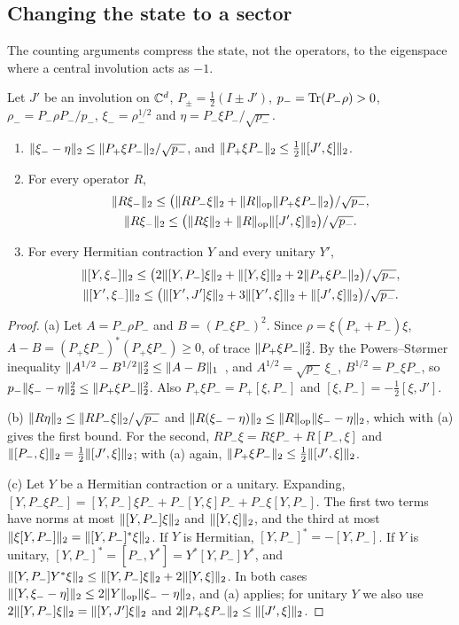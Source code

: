 \subsection{Changing the state to a sector}\label{state:sector}

The counting arguments compress the state, not the operators, to the eigenspace where a central involution acts as $-1$.

\begin{lemma}\label{lem:sector-state}
Let $J'$ be an involution on $\mathbb C^d$, $P_\pm=\frac12(I\pm J')$, $p_-=\operatorname{Tr}(P_-\rho)>0$, $\rho_-=P_-\rho P_-/p_-$, $\xi_-=\rho_-^{1/2}$ and
$\eta=P_-\xi P_-/\sqrt{p_-}$.
\begin{enumerate}[label=(\alph*),itemsep=1pt]
\item $\lVert \xi_--\eta\rVert_2\le\lVert P_+\xi P_-\rVert_2/\sqrt{p_-}$, and $\lVert P_+\xi P_-\rVert_2\le\frac12\lVert [J',\xi]\rVert_2$.
\item For every operator $R$,
\begin{gather*}
\lVert R\xi_-\rVert_2\le\bigl(\lVert RP_-\xi\rVert_2+\lVert R\rVert_{\mathrm{op}}\lVert P_+\xi P_-\rVert_2\bigr)/\sqrt{p_-},\\
\lVert R\xi_-\rVert_2\le\bigl(\lVert R\xi\rVert_2+\lVert R\rVert_{\mathrm{op}}\lVert [J',\xi]\rVert_2\bigr)/\sqrt{p_-}.
\end{gather*}
\item For every Hermitian contraction $Y$ and every unitary $Y'$,
\begin{gather*}
\lVert [Y,\xi_-]\rVert_2\le\bigl(2\lVert [Y,P_-]\xi\rVert_2+\lVert [Y,\xi]\rVert_2+2\lVert P_+\xi P_-\rVert_2\bigr)/\sqrt{p_-},\\
\lVert [Y',\xi_-]\rVert_2\le\bigl(\lVert [Y',J']\xi\rVert_2+3\lVert [Y',\xi]\rVert_2+\lVert [J',\xi]\rVert_2\bigr)/\sqrt{p_-}.
\end{gather*}
\end{enumerate}
\end{lemma}

\begin{proof}
(a) Let $A=P_-\rho P_-$ and $B=(P_-\xi P_-)^2$. Since $\rho=\xi(P_++P_-)\xi$, $A-B=(P_+\xi P_-)^*(P_+\xi P_-)\ge0$, of trace
$\lVert P_+\xi P_-\rVert_2^2$. By the Powers--St{\o}rmer inequality $\lVert A^{1/2}-B^{1/2}\rVert_2^2\le\lVert A-B\rVert_1$~\cite[Lemma~4.1]{PS70}, and
$A^{1/2}=\sqrt{p_-}\,\xi_-$, $B^{1/2}=P_-\xi P_-$, so $p_-\lVert \xi_--\eta\rVert_2^2\le\lVert P_+\xi P_-\rVert_2^2$. Also $P_+\xi P_-=P_+[\xi,P_-]$ and
$[\xi,P_-]=-\frac12[\xi,J']$.

(b) $\lVert R\eta\rVert_2\le\lVert RP_-\xi\rVert_2/\sqrt{p_-}$ and $\lVert R(\xi_--\eta)\rVert_2\le\lVert R\rVert_{\mathrm{op}}\lVert \xi_--\eta\rVert_2$, which with (a) gives the first bound. For the
second, $RP_-\xi=R\xi P_-+R[P_-,\xi]$ and $\lVert [P_-,\xi]\rVert_2=\frac12\lVert [J',\xi]\rVert_2$; with (a) again, $\lVert P_+\xi P_-\rVert_2\le\frac12\lVert [J',\xi]\rVert_2$.

(c) Let $Y$ be a Hermitian contraction or a unitary. Expanding, $[Y,P_-\xi P_-]=[Y,P_-]\xi P_-+P_-[Y,\xi]P_-+P_-\xi[Y,P_-]$. The
first two terms have norms at most $\lVert [Y,P_-]\xi\rVert_2$ and $\lVert [Y,\xi]\rVert_2$, and the third at most $\lVert \xi[Y,P_-]\rVert_2=\lVert [Y,P_-]^*\xi\rVert_2$. If $Y$
is Hermitian, $[Y,P_-]^*=-[Y,P_-]$. If $Y$ is unitary, $[Y,P_-]^*=[P_-,Y^*]=Y^*[Y,P_-]Y^*$, and
$\lVert [Y,P_-]Y^*\xi\rVert_2\le\lVert [Y,P_-]\xi\rVert_2+2\lVert [Y,\xi]\rVert_2$. In both cases
$\lVert [Y,\xi_--\eta]\rVert_2\le2\lVert Y\rVert_{\mathrm{op}}\lVert \xi_--\eta\rVert_2$, and (a) applies; for unitary $Y$ we also use $2\lVert [Y,P_-]\xi\rVert_2=\lVert [Y,J']\xi\rVert_2$ and
$2\lVert P_+\xi P_-\rVert_2\le\lVert [J',\xi]\rVert_2$.
\end{proof}

